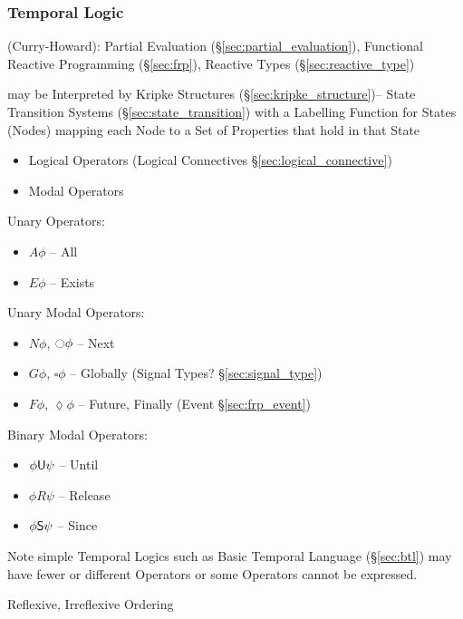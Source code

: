 \subsubsection{Temporal Logic}\label{sec:temporal_logic}

(Curry-Howard): Partial Evaluation (\S\ref{sec:partial_evaluation}),
Functional Reactive Programming (\S\ref{sec:frp}), Reactive Types
(\S\ref{sec:reactive_type})

may be Interpreted by Kripke Structures
(\S\ref{sec:kripke_structure})-- State Transition Systems
(\S\ref{sec:state_transition}) with a Labelling Function for States
(Nodes) mapping each Node to a Set of Properties that hold in that
State

\begin{itemize}
  \item Logical Operators (Logical Connectives
    \S\ref{sec:logical_connective})
  \item Modal Operators
\end{itemize}


Unary Operators:
\begin{itemize}
  \item $A\phi$ -- All
  \item $E\phi$ -- Exists
\end{itemize}

Unary Modal Operators:
\begin{itemize}
  \item $N\phi$, $\ocircle\phi$ -- Next
  \item $G\phi$, $\square\phi$ -- Globally
    (Signal Types? \S\ref{sec:signal_type}) %
  \item $F\phi$, $\lozenge\phi$ -- Future, Finally (Event
    \S\ref{sec:frp_event})
\end{itemize}

Binary Modal Operators:
\begin{itemize}
  \item $\phi \mathsf{U} \psi$ -- Until
  \item $\phi R \psi$ -- Release
  \item $\phi \mathsf{S} \psi$ -- Since
\end{itemize}

\fist Note simple Temporal Logics such as Basic Temporal Language
(\S\ref{sec:btl}) may have fewer or different Operators or some
Operators cannot be expressed.

Reflexive, Irreflexive Ordering


\asterism


